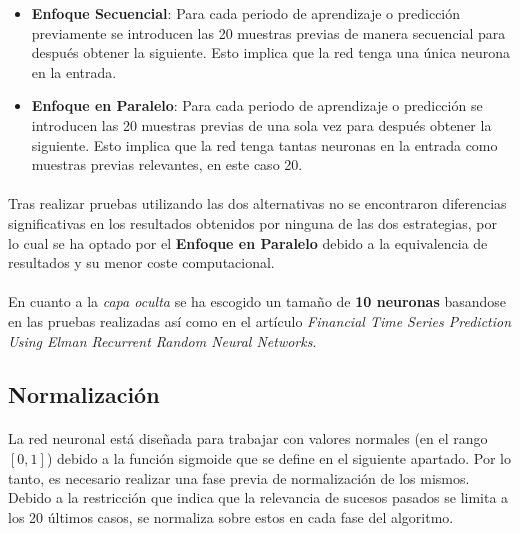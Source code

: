 \documentclass[10pt, a4paper,spanish]{article}
\begin{document}
 			\begin{itemize}
 				\item \textbf{Enfoque Secuencial}: Para cada periodo de aprendizaje o predicción previamente se introducen las 20 muestras previas de manera secuencial para después obtener la siguiente. Esto implica que la red tenga una única neurona en la entrada.

				\item \textbf{Enfoque en Paralelo}: Para cada periodo de aprendizaje o predicción se introducen las 20 muestras previas de una sola vez para después obtener la siguiente. Esto implica que la red tenga tantas neuronas en la entrada como muestras previas relevantes, en este caso 20.
 			\end{itemize}

			\paragraph{}
			Tras realizar pruebas utilizando las dos alternativas no se encontraron diferencias significativas en los resultados obtenidos por ninguna de las dos estrategias, por lo cual se ha optado por el \textbf{Enfoque en Paralelo} debido a la equivalencia de resultados y su menor coste computacional.

			\paragraph{}
			En cuanto a la \emph{capa oculta} se ha escogido un tamaño de \textbf{10 neuronas} basandose en las pruebas realizadas así como en el artículo \emph{Financial Time Series Prediction Using Elman Recurrent Random Neural Networks}\cite{financial:article}.


		\subsection{Normalización}

			\paragraph{}
			La red neuronal está diseñada para trabajar con valores normales (en el rango $[0,1]$) debido a la función sigmoide que se define en el siguiente apartado. Por lo tanto, es necesario realizar una fase previa de normalización de los mismos. Debido a la restricción que indica que la relevancia de sucesos pasados se limita a los 20 últimos casos, se normaliza sobre estos en cada fase del algoritmo.
\end{document}
